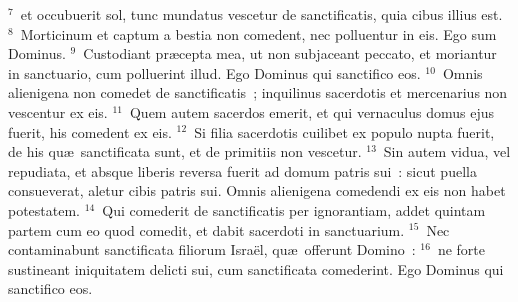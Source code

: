 ${}^{7}$~et occubuerit sol, tunc mundatus vescetur de sanctificatis, quia cibus illius est.
${}^{8}$~Morticinum et captum a bestia non comedent, nec polluentur in eis. Ego sum Dominus.
${}^{9}$~Custodiant pr\ae cepta mea, ut non subjaceant peccato, et moriantur in sanctuario, cum polluerint illud. Ego Dominus qui sanctifico eos.
${}^{10}$~Omnis alienigena non comedet de sanctificatis~; inquilinus sacerdotis et mercenarius non vescentur ex eis.
${}^{11}$~Quem autem sacerdos emerit, et qui vernaculus domus ejus fuerit, his comedent ex eis.
${}^{12}$~Si filia sacerdotis cuilibet ex populo nupta fuerit, de his qu\ae\ sanctificata sunt, et de primitiis non vescetur.
${}^{13}$~Sin autem vidua, vel repudiata, et absque liberis reversa fuerit ad domum patris sui~: sicut puella consueverat, aletur cibis patris sui. Omnis alienigena comedendi ex eis non habet potestatem.
${}^{14}$~Qui comederit de sanctificatis per ignorantiam, addet quintam partem cum eo quod comedit, et dabit sacerdoti in sanctuarium.
${}^{15}$~Nec contaminabunt sanctificata filiorum Isra\"el, qu\ae\ offerunt Domino~:
${}^{16}$~ne forte sustineant iniquitatem delicti sui, cum sanctificata comederint. Ego Dominus qui sanctifico eos.


